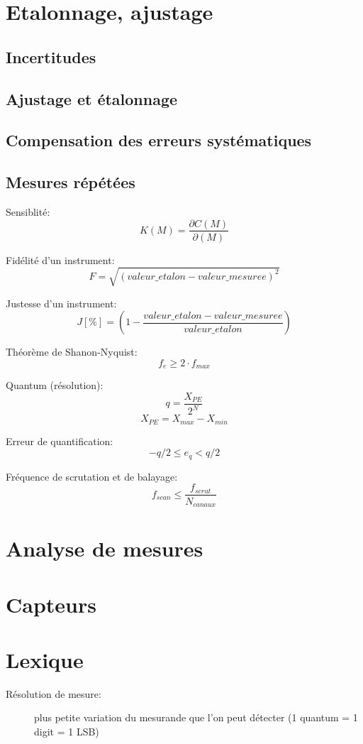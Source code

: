 \documentclass[10pt, twocolumn]{article}
\begin{document}
	\section*{Etalonnage, ajustage}
		
		\subsection*{Incertitudes}
		\subsection*{Ajustage et étalonnage}
		\subsection*{Compensation des erreurs systématiques}
		\subsection*{Mesures répétées}
			
			Sensiblité:
			\[K(M) = \frac{\partial C(M)}{\partial (M)}\]
			
			Fidélité d'un instrument:
			\[F = \sqrt{(valeur\_etalon - valeur\_mesuree)^{2}}\]
			
			Justesse d'un instrument:
			\[J [\%] = (1 - \frac{valeur\_etalon - valeur\_mesuree}{valeur\_etalon})\]
			
			Théorème de Shanon-Nyquist:
			\[f_{e} \geq 2 \cdot f_{max}\]
			
			Quantum (résolution):
			\[q = \frac{X_{PE}}{2^N}\]
			\[X_{PE} = X_{max}-X_{min}\]
			
			Erreur de quantification:
			\[-q/2 \leq e_q < q/2\]
			
			Fréquence de scrutation et de balayage:
			\[f_{scan} \leq \frac{f_{scrut}}{N_{canaux}}\]
			
	\section*{Analyse de mesures}
	\section*{Capteurs}
	\section*{Lexique}
	
		\begin{description}
		
			\item [Résolution de mesure:] plus petite variation du mesurande que l'on peut détecter (1 quantum = 1 digit = 1 LSB)
		\end{description}
		
		
\end{document}
